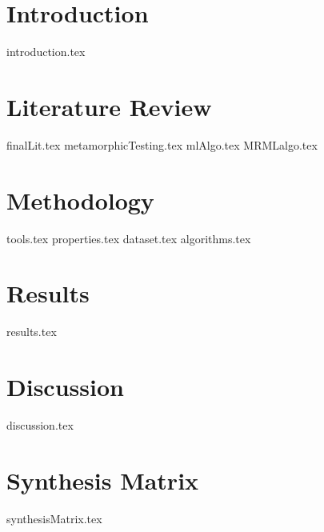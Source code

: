 \documentclass[print,ms]{unothesis}
\begin{document}
\mainmatter


\chapter{Introduction}
{introduction.tex}
% 

\chapter{Literature Review}
{finalLit.tex}
{metamorphicTesting.tex}
{mlAlgo.tex}
{MRMLalgo.tex}

\chapter{Methodology}
{tools.tex}
{properties.tex}
{dataset.tex}
{algorithms.tex}



\chapter{Results}
{results.tex}

\chapter{Discussion}
{discussion.tex}

\backmatter

\nocite{*}



\appendix
\chapter{Synthesis Matrix}
{synthesisMatrix.tex}
\end{document}

